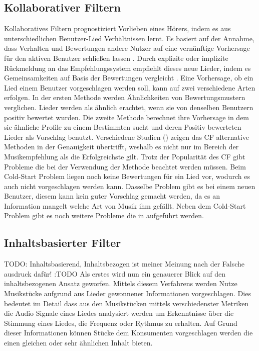 \documentclass[twosided,a4,10pt]{article}
\begin{document}
\begin{multicols}{2}
\subsection{Kollaborativer Filtern}
Kollaboratives Filtern prognostiziert Vorlieben eines Hörers, indem es aus unterschiedlichen Benutzer-Lied Verhältnissen lernt. Es basiert auf der Annahme, dass Verhalten und Bewertungen andere Nutzer auf eine vernünftige Vorhersage für den aktiven Benutzer schließen lassen \cite{celma}. Durch explizite oder implizite Rückmeldung an das Empfehlungssystem empfiehlt dieses neue Lieder, indem es Gemeinsamkeiten auf Basis der Bewertungen vergleicht \cite{mcfee}.\newline
Eine Vorhersage, ob ein Lied einem Benutzer vorgeschlagen werden soll, kann auf zwei verschiedene Arten erfolgen. In der ersten Methode werden Ähnlichkeiten von Bewertungsmustern verglichen. Lieder werden als ähnlich erachtet, wenn sie von denselben Benutzern positiv bewertet wurden. Die zweite Methode berechnet ihre Vorhersage in dem sie ähnliche Profile zu einem Bestimmten sucht und deren Positiv bewerteten Lieder als Vorschlag benutzt. \cite{ekstrandand}\newline
Verschiedene Studien (\cite{mcfee}\cite{barrington}) zeigen das CF alternative Methoden in der Genauigkeit übertrifft, weshalb es nicht nur im Bereich der Musikempfehlung als die Erfolgreichste gilt.\newline
Trotz der Popularität des CF gibt Probleme die bei der Verwendung der Methode beachtet werden müssen. Beim Cold-Start Problem liegen noch keine Bewertungen für ein Lied vor, wodurch es auch nicht vorgeschlagen werden kann. Dasselbe Problem gibt es bei einem neuen Benutzer, diesem kann kein guter Vorschlag gemacht werden, da es an Information mangelt welche Art von Musik ihm gefällt. \cite{celma} Neben dem Cold-Start Problem gibt es noch weitere Probleme die in \cite{celma} aufgeführt werden.

\subsection{Inhaltsbasierter Filter}
TODO: Inhaltsbasierend, Inhaltsbezogen ist meiner Meinung nach der Falsche ausdruck dafür! :TODO
Als erstes wird nun ein genauerer Blick auf den inhaltsbezogenen Ansatz geworfen. Mittels diesem Verfahrens werden Nutze Musikstücke aufgrund aus Lieder gewonnener Informationen vorgeschlagen. Dies bedeutet im Detail dass aus den Musikstücken mittels verschiedenster Metriken die Audio Signale eines Liedes analysiert werden um Erkenntnisse über die Stimmung eines Liedes, die Frequenz oder Rythmus zu erhalten. Auf Grund dieser Informationen können Stücke dem Konsumenten vorgeschlagen werden die einen gleichen oder sehr ähnlichen Inhalt bieten.

\end{multicols}
\end{document}
